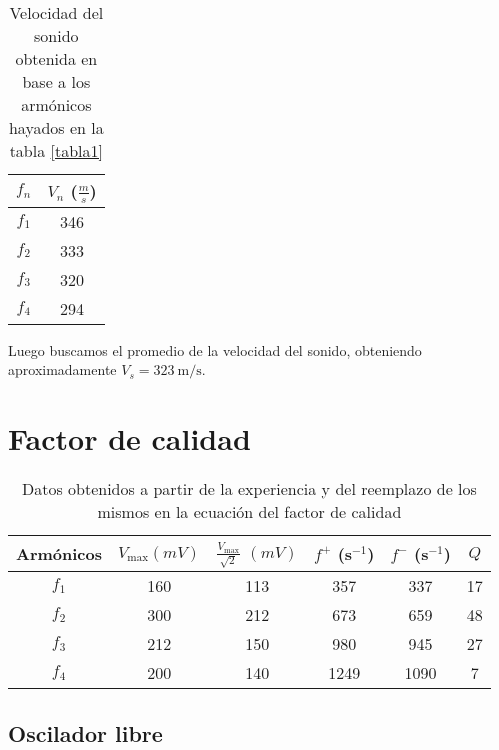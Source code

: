 \documentclass[12pt,a4paper]{article}
\begin{document}
\begin{table}[H]
    \centering
    \begin{tabular}{|c|c|}
    \hline
    \multirow{1}{2.1cm}{\centering $f_n$} 
        & $V_n$ ($\frac{m}{s}$) \\
    \hline
    $f_1$  & 346 \\ \hline
    $f_2$  & 333 \\ \hline
    $f_3$  & 320 \\ \hline
    $f_4$  & 294  \\ \hline
    \end{tabular}
    \caption{Velocidad del sonido obtenida en base a los armónicos hayados en la tabla \ref{tabla1}}
    \label{tabla2}
\end{table}

Luego buscamos el promedio de la velocidad del sonido, obteniendo aproximadamente $V_s = 323 \ \mathrm{m/s}$.
\section{Factor de calidad}

\begin{table}[H]
    \centering
    \begin{tabular}{|c|c|c|c|c|c|}
    \hline
    \multirow{1}{2.1cm}{\centering Armónicos} 
        & $V_\mathrm{max} (mV)$
        & $\frac{V_\mathrm{max}}{\sqrt{2}}$ $(mV)$ 
        & $f^+$ (s$^{-1}$) 
        & $f^-$ (s$^{-1}$)
        & $Q$ \\
    \hline
    $f_1$  & 160 & 113 & 357 & 337 & 17\\ \hline
    $f_2$  & 300 & 212 & 673 & 659 & 48\\ \hline
    $f_3$  & 212  & 150 & 980 & 945 & 27\\ \hline
    $f_4$  & 200  & 140 & 1249 & 1090 & 7\\ \hline
    \end{tabular}
    \caption{Datos obtenidos a partir de la experiencia y del reemplazo de los mismos en la ecuación del factor de calidad}
    \label{tabla3}
\end{table}















\subsection{Oscilador libre}
\end{document}
